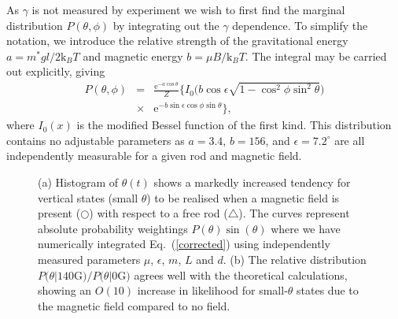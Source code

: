 \documentclass[aps,prl,reprint,twocolumn,superscriptaddress,showpacs]{revtex4-1}
\newcommand{\ee}{\mathrm{e}}
\newcommand{\kk}{\mathrm{k}_B}
\begin{document}
As $\gamma$ is not measured by experiment we wish to first find the marginal distribution $P(\theta,\phi)$ by integrating out the $\gamma$ dependence. To simplify the notation, we introduce the relative strength of the gravitational energy $a=m^*gl/2 \kk T$ and magnetic energy $b=\mu B/\kk T$. The integral may be carried out explicitly, giving
\begin{eqnarray}\label{corrected}
P(\theta,\phi)  & = & \frac{\ee^{-a\cos\theta}}{Z} \Big\{ I_0\Big( b\cos\epsilon\sqrt{1-\cos^2\phi\sin^2\theta} \Big) \nonumber\\
& \times &  \ee^{-b \sin\epsilon \cos\phi\sin\theta}\Big\}, \label{P_corrected}
\end{eqnarray}
where $I_0(x)$ is the modified Bessel function of the first kind. This distribution contains no adjustable parameters as $a=3.4$, $b=156$, and $\epsilon=7.2^\circ$ are all independently measurable for a given rod and magnetic field.
\begin{figure}
\centering
    \caption{\footnotesize (a) Histogram of $\theta(t)$ shows a markedly increased tendency for vertical states (small $\theta$) to be realised when a magnetic field is present ({\color{NavyBlue}$\bigcirc$}) with respect to a free rod ({\color{red}$\bigtriangleup$}). The curves represent absolute probability weightings $P(\theta) \sin(\theta)$ where we have numerically integrated Eq.\ (\ref{corrected}) using independently measured parameters $\mu$, $\epsilon$, $m$, $L$ and $d$. (b) The relative distribution $P(\theta | 140 $G$)/P(\theta | 0 $G$)$ agrees well with the theoretical calculations, showing an $O(10)$ increase in likelihood for small-$\theta$ states due to the magnetic field compared to no field.}
\end{figure}
\end{document}
